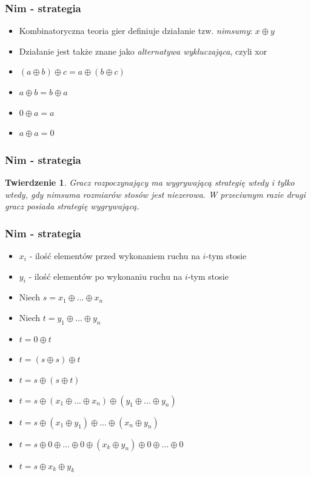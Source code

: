\documentclass[polish,envcountsect,10pt]{beamer}
\newtheorem{twrdz}{Twierdzenie}
\begin{document}
                \begin{frame}
                    \frametitle{Nim - strategia}
                        \begin{itemize}
                            \item<1->Kombinatoryczna teoria gier definiuje działanie tzw. \textit{nimsumy}: $x \oplus y$
                            \item<2-> Działanie jest także znane jako \textit{alternatywa wykluczająca}, czyli xor
                            \item<3-> $(a \oplus b) \oplus c = a \oplus (b \oplus c)$
                            \item<4-> $a \oplus b = b \oplus a$
                            \item<5-> $0 \oplus a = a$
                            \item<6-> $a \oplus a = 0$
                        \end{itemize}
                \end{frame}
                \begin{frame}
                    \frametitle{Nim - strategia}
                        \begin{twrdz}
                            Gracz rozpoczynający ma wygrywającą strategię wtedy i tylko wtedy, gdy nimsuma rozmiarów stosów jest niezerowa. W przeciwnym razie drugi gracz posiada strategię wygrywającą.
                        \end{twrdz} 
                \end{frame}
                \begin{frame}
                    \frametitle{Nim - strategia}
                        \begin{itemize}
                            \item<1-> $x_i$ - ilość elementów przed wykonaniem ruchu na $i$-tym stosie
                            \item<2-> $y_i$ - ilość elementów po wykonaniu ruchu na $i$-tym stosie
                            \item<3-> Niech $s = x_1 \oplus ... \oplus x_n$
                            \item<4-> Niech $t = y_1 \oplus ... \oplus y_n$
                            \item<5-> $t = 0 \oplus t $ 
                            \item<6-> $t = (s \oplus s) \oplus t$
                            \item<7-> $t = s \oplus (s \oplus t)$
                            \item<8-> $t = s \oplus (x_1 \oplus ... \oplus x_n) \oplus (y_1 \oplus ... \oplus y_n)$
                            \item<9-> $t = s \oplus (x_1 \oplus y_1) \oplus ... \oplus (x_n \oplus y_n) $
                            \item<10-> $t = s \oplus 0 \oplus ... \oplus 0 \oplus (x_k \oplus y_n) \oplus 0 \oplus ... \oplus 0$
                            \item<11-> $t = s \oplus x_k \oplus y_k$
                        \end{itemize}
                \end{frame}
\end{document}
